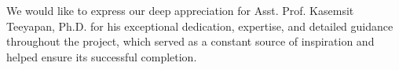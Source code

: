 \iffalse
\begin{dedication}
This document is dedicated to all Chiang Mai University students.

Dedication page is optional.
\end{dedication}
\fi %

\begin{acknowledgments}
We would like to express our deep appreciation for Asst. Prof. Kasemsit Teeyapan, Ph.D. for his exceptional dedication, expertise, and detailed guidance throughout the project, which served as a constant source of inspiration and helped ensure its successful completion.

\end{acknowledgments}%
\fi %

\contentspage

\ifproject
\figurelistpage

\tablelistpage
\fi %



